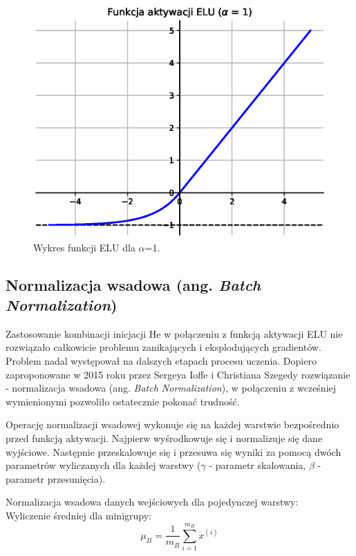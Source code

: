\documentclass[a4paper,11pt]{article}
\begin{document}
    \begin{figure}[H]
        \label{fig:elu}
        \centering
        \includegraphics[width=\textwidth]{elu}
        \caption{Wykres funkcji ELU dla $\alpha$=1.}
    \end{figure}

    \subsection{Normalizacja wsadowa (ang. \textit{Batch Normalization})}

    Zastosowanie kombinacji inicjacji He w połączeniu z funkcją aktywacji ELU nie rozwiązało całkowicie problemu zanikających i eksplodujących gradientów. Problem nadal występował na dalszych etapach procesu uczenia. Dopiero zaproponowane w 2015 roku przez Sergeya Ioffe i Christiana Szegedy rozwiązanie - normalizacja wsadowa (ang. \textit{Batch Normalization}), w połączeniu z wcześniej wymienionymi pozwoliło ostatecznie pokonać trudność\cite{BatchNormalization2015}.

    \bigskip

    Operację normalizacji wsadowej wykonuje się na każdej warstwie bezpośrednio przed funkcją aktywacji. Najpierw wyśrodkowuje się i normalizuje się dane wyjściowe. Następnie przeskalowuje się i przesuwa się wyniki za pomocą dwóch parametrów wyliczanych dla każdej warstwy ($\gamma$ - parametr skalowania, $\beta$ - parametr przesunięcia)\cite{UczenieMaszynowe2018}.

    \bigskip

    \noindent
    \begin{minipage}[H]{\textwidth}
        \setlength\parindent{17pt} Normalizacja wsadowa danych wejściowych dla pojedynczej warstwy: \\
        \bigskip
        \setlength\parindent{17pt} Wyliczenie średniej dla minigrupy: \\
        \begin{equation}
            \label{eq:minibatch_mean}
            \mu_{B} = \frac{1}{m_{B}} \displaystyle\sum_{i=1}^{m_{B}} x^{(i)}
        \end{equation}
    \end{minipage}
\end{document}
